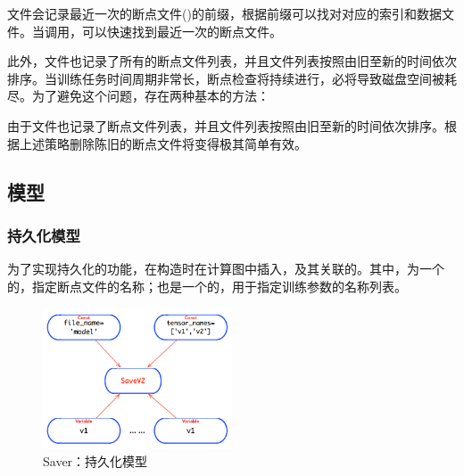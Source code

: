 \begin{content}
文件会记录最近一次的断点文件()的前缀，根据前缀可以找对对应的索引和数据文件。当调用，可以快速找到最近一次的断点文件。


此外，文件也记录了所有的断点文件列表，并且文件列表按照由旧至新的时间依次排序。当训练任务时间周期非常长，断点检查将持续进行，必将导致磁盘空间被耗尽。为了避免这个问题，存在两种基本的方法：

\begin{enum}
\end{enum}

由于文件也记录了断点文件列表，并且文件列表按照由旧至新的时间依次排序。根据上述策略删除陈旧的断点文件将变得极其简单有效。

\subsection{模型}

\subsubsection{持久化模型}

为了实现持久化的功能，在构造时在计算图中插入，及其关联的。其中，为一个的，指定断点文件的名称；也是一个的，用于指定训练参数的名称列表。

\begin{figure}[!htbp]
\centering
\includegraphics[width=0.5\textwidth]{figures/py-saver-save-model.png}
\caption{Saver：持久化模型}
 \label{fig:py-saver-save-model}
\end{figure}


\end{content}
